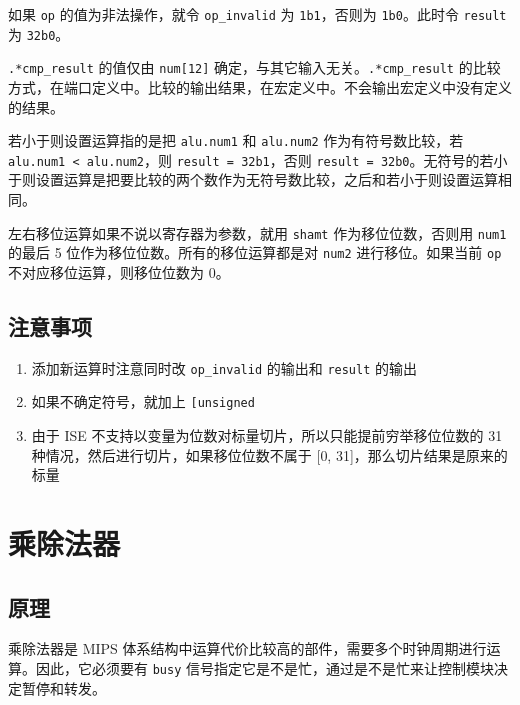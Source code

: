 \documentclass[12pt,AutoFakeBold,AutoFakeSlant]{article}
\providecommand{\tightlist}{%
  \setlength{\itemsep}{0pt}\setlength{\parskip}{0pt}}
\begin{document}
如果 \texttt{op} 的值为非法操作，就令 \texttt{op\_invalid} 为
\texttt{1\textquotesingle{}b1}，否则为
\texttt{1\textquotesingle{}b0}。此时令 \texttt{result} 为
\texttt{32\textquotesingle{}b0}。

\texttt{.*cmp\_result} 的值仅由 \texttt{num{[}12{]}}
确定，与其它输入无关。\texttt{.*cmp\_result}
的比较方式，在端口定义中。比较的输出结果，在宏定义中。不会输出宏定义中没有定义的结果。

若小于则设置运算指的是把 \texttt{alu.num1} 和 \texttt{alu.num2}
作为有符号数比较，若 \texttt{alu.num1\ \textless{}\ alu.num2}，则
\texttt{result\ =\ 32\textquotesingle{}b1}，否则
\texttt{result\ =\ 32\textquotesingle{}b0}。无符号的若小于则设置运算是把要比较的两个数作为无符号数比较，之后和若小于则设置运算相同。

左右移位运算如果不说以寄存器为参数，就用 \texttt{shamt}
作为移位位数，否则用 \texttt{num1} 的最后 5
位作为移位位数。所有的移位运算都是对 \texttt{num2} 进行移位。如果当前
\texttt{op} 不对应移位运算，则移位位数为 0。

\hypertarget{ux6ce8ux610fux4e8bux9879-4}{%
\subsection{注意事项}\label{ux6ce8ux610fux4e8bux9879-4}}

\begin{enumerate}
\def\labelenumi{\arabic{enumi}.}
\tightlist
\item
  添加新运算时注意同时改 \texttt{op\_invalid} 的输出和 \texttt{result}
  的输出
\item
  如果不确定符号，就加上 \texttt{{[}un\textbar{}{]}signed}
\item
  由于 ISE 不支持以变量为位数对标量切片，所以只能提前穷举移位位数的 31
  种情况，然后进行切片，如果移位位数不属于 {[}0,
  31{]}，那么切片结果是原来的标量
\end{enumerate}

\hypertarget{ux4e58ux9664ux6cd5ux5668}{%
\section{乘除法器}\label{ux4e58ux9664ux6cd5ux5668}}

\hypertarget{ux539fux7406-6}{%
\subsection{原理}\label{ux539fux7406-6}}

乘除法器是 MIPS 体系结构中运算代价比较高的部件，需要多个时钟周期进行运算。因此，它必须要有
\texttt{busy} 信号指定它是不是忙，通过是不是忙来让控制模块决定暂停和转发。
\end{document}
